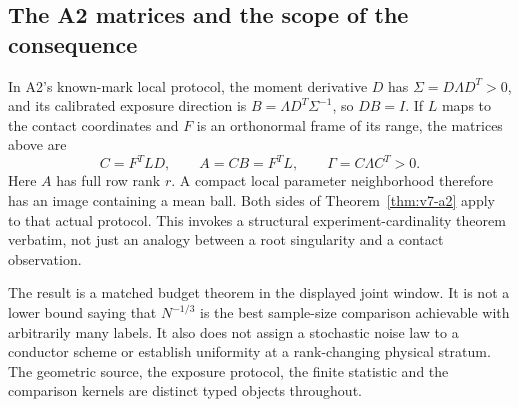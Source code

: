 \subsection{The A2 matrices and the scope of the consequence}
In A2's known-mark local protocol, the moment derivative $D$ has
$\Sigma=D\Lambda D^T>0$, and its calibrated exposure direction is
$B=\Lambda D^T\Sigma^{-1}$, so $DB=I$. If $L$ maps to the contact
coordinates and $F$ is an orthonormal frame of its range, the matrices
above are
\[
 C=F^TLD,\qquad A=CB=F^TL,\qquad \Gamma=C\Lambda C^T>0.
\]
Here $A$ has full row rank $r$. A compact local parameter neighborhood
therefore has an image containing a mean ball. Both sides of
Theorem~\ref{thm:v7-a2} apply to that actual protocol. This invokes a
structural experiment-cardinality theorem verbatim, not just an analogy
between a root singularity and a contact observation.

The result is a matched budget theorem in the displayed joint window.
It is not a lower bound saying that $N^{-1/3}$ is the best sample-size
comparison achievable with arbitrarily many labels. It also does not
assign a stochastic noise law to a conductor scheme or establish
uniformity at a rank-changing physical stratum. The geometric source,
the exposure protocol, the finite statistic and the comparison kernels
are distinct typed objects throughout.
